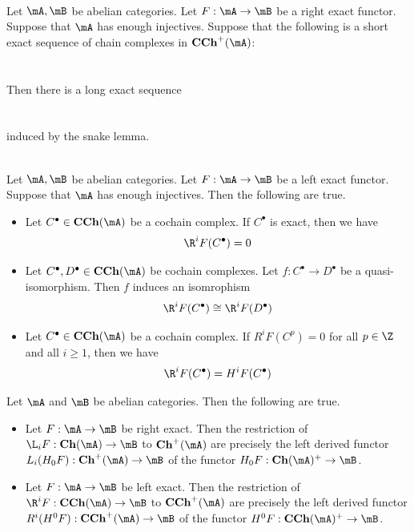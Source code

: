 \documentclass[a4paper]{article}
\begin{document}
\begin{lmm}{}{}\\
Let $\mA,\mB$ be abelian categories. Let $F:\mA\to\mB$ be a right exact functor. Suppose that $\mA$ has enough injectives. Suppose that the following is a short exact sequence of chain complexes in $\bold{CCh}^+(\mA)$: \\~\\
\\
Then there is a long exact sequence \\~\\
\\
induced by the snake lemma. 
\end{lmm}

\begin{crl}{}{}\\
Let $\mA,\mB$ be abelian categories. Let $F:\mA\to\mB$ be a left exact functor. Suppose that $\mA$ has enough injectives. Then the following are true. 
\begin{itemize}
\item Let $C^\bullet\in\bold{CCh}(\mA)$ be a cochain complex. If $C^\bullet$ is exact, then we have $$\R^iF(C^\bullet)=0$$
\item Let $C^\bullet,D^\bullet\in\bold{CCh}(\mA)$ be cochain complexes. Let $f:C^\bullet\to D^\bullet$ be a quasi-isomorphism. Then $f$ induces an isomrophism $$\R^iF(C^\bullet)\cong\R^iF(D^\bullet)$$
\item Let $C^\bullet\in\bold{CCh}(\mA)$ be a cochain complex. If $R^iF(C^p)=0$ for all $p\in\Z$ and all $i\geq 1$, then we have $$\R^iF(C^\bullet)=H^iF(C^\bullet)$$
\end{itemize}
\end{crl}

\begin{lmm}{}{} Let $\mA$ and $\mB$ be abelian categories. Then the following are true. 
\begin{itemize}
\item Let $F:\mA\to\mB$ be right exact. Then the restriction of $\L_i F:\bold{Ch}(\mA)\to\mB$ to $\bold{Ch}^+(\mA)$ are precisely the left derived functor $L_i (H_0F):\bold{Ch}^+(\mA)\to\mB$ of the functor $H_0F:\bold{Ch}(\mA)^+\to\mB$. 
\item Let $F:\mA\to\mB$ be left exact. Then the restriction of $\R^i F:\bold{CCh}(\mA)\to\mB$ to $\bold{CCh}^+(\mA)$ are precisely the left derived functor $R^i (H^0F):\bold{CCh}^+(\mA)\to\mB$ of the functor $H^0F:\bold{CCh}(\mA)^+\to\mB$. 
\end{itemize}
\end{lmm}
\end{document}
